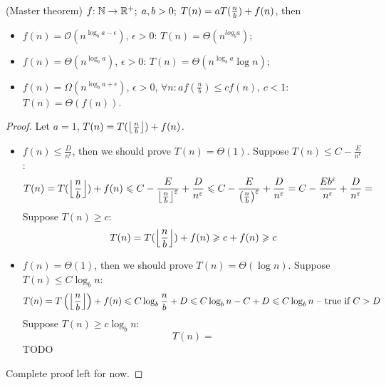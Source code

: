 \begin{theorem} (Master theorem)
    $ f{:}\; \mathbb{N} \rightarrow \mathbb{R^+};\; a, b > 0;\; T(n) = a T(\frac n b) + f(n) $, then
    \begin{itemize}
        \item $f(n) = \mathcal{O}\!\left(n^{\log_b a - \epsilon}\right)$, $\epsilon > 0$: $T(n) = \Theta\left( n^{log_b a} \right)$;
        \item $f(n) = \Theta\!\left(n^{\log_b a}\right)$, $\epsilon > 0$: $T(n) = \Theta\left( n^{\log_b a} \log{n} \right)$;
        \item $f(n) = \Omega\!\left(n^{\log_b a + \epsilon}\right)$, $\epsilon > 0$, $\forall n: a f(\frac{n}{b}) \le c f(n)$, $c < 1$: $T(n) = \Theta(f(n))$.
    \end{itemize}
\end{theorem}

\begin{proof}
Let $a = 1$, $T(n) = T(\left\lfloor\frac n b\right\rfloor) + f(n)$.

\begin{itemize}
    \item $f(n) \le \frac{D}{n^\epsilon}$, then we should prove $T(n) = \Theta(1)$. Suppose $T(n) \le C - \frac E {n^\epsilon}$:
    \[
        T(n) =
        T(\left\lfloor\frac n b\right\rfloor) + f(n) \leqslant
        C - \frac E {\left\lfloor\frac n b\right\rfloor^{\varepsilon}} + \frac{D}{n^{\varepsilon}} \leqslant
        C - \frac E {\left(\frac n b\right)^{\varepsilon}} + \frac{D}{n^{\varepsilon}} =
        C - \frac{E b^{\varepsilon}}{n^{\varepsilon}} + \frac{D}{n^{\varepsilon}} =
    \]
    Suppose $T(n) \ge c$:
    \[ T(n) = T(\left\lfloor\frac n b\right\rfloor) + f(n) \geqslant c + f(n) \geqslant c \]

    \item $f(n) = \Theta(1)$, then we should prove $T(n) = \Theta(\log n)$. Suppose $T(n) \le C \log_b n$:
    \[
        T(n) =
        T\left(\left\lfloor\frac n b\right\rfloor\right) + f(n) \leqslant
        C \log_b {\frac n b} + D \leqslant C \log_b n - C + D \leqslant C \log_b n
        \text{ -- true if } C > D
    \]
    Suppose $T(n) \ge c \log_b n$:
    \[
        T(n) =
    \]
    TODO
\end{itemize}

Complete proof left for now.
\end{proof}
